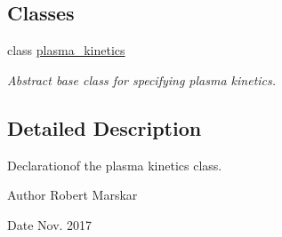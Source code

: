 \subsection*{Classes}
\begin{DoxyCompactItemize}
\item 
class \hyperlink{classplasma__kinetics}{plasma\+\_\+kinetics}
\begin{DoxyCompactList}\small\item\em Abstract base class for specifying plasma kinetics. \end{DoxyCompactList}\end{DoxyCompactItemize}


\subsection{Detailed Description}
Declarationof the plasma kinetics class. 

\begin{DoxyAuthor}{Author}
Robert Marskar 
\end{DoxyAuthor}
\begin{DoxyDate}{Date}
Nov. 2017 
\end{DoxyDate}
